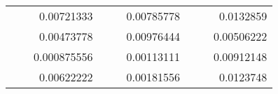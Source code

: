 \begin{table}[H]
\begin{tabular}{|ccrccrccc}
\rowcolor[HTML]{DDFDFF} 
\multicolumn{1}{|c|}{\cellcolor[HTML]{FFFFC7}}                                & \multicolumn{1}{c|}{\cellcolor[HTML]{DDFDFF}}                      & \multicolumn{1}{r|}{\cellcolor[HTML]{DAE8FC}0.00721333}  & \multicolumn{1}{c|}{\cellcolor[HTML]{FFFFC7}}                                & \multicolumn{1}{c|}{\cellcolor[HTML]{DDFDFF}}                       & \multicolumn{1}{r|}{\cellcolor[HTML]{DDFDFF}0.00785778}  & \multicolumn{1}{c|}{\cellcolor[HTML]{FFFFC7}}                                & \multicolumn{1}{c|}{\cellcolor[HTML]{DDFDFF}}                      & \multicolumn{1}{r|}{\cellcolor[HTML]{DDFDFF}0.0132859}   \\ \cline{3-3} \cline{6-6} \cline{9-9} 
\multicolumn{1}{|c|}{\cellcolor[HTML]{FFFFC7}}                                & \multicolumn{1}{c|}{\cellcolor[HTML]{DDFDFF}}                      & \multicolumn{1}{r|}{\cellcolor[HTML]{DDFDFF}0.00473778}  & \multicolumn{1}{c|}{\cellcolor[HTML]{FFFFC7}}                                & \multicolumn{1}{c|}{\cellcolor[HTML]{DDFDFF}}                       & \multicolumn{1}{r|}{\cellcolor[HTML]{DAE8FC}0.00976444}  & \multicolumn{1}{c|}{\cellcolor[HTML]{FFFFC7}}                                & \multicolumn{1}{c|}{\cellcolor[HTML]{DDFDFF}}                      & \multicolumn{1}{r|}{\cellcolor[HTML]{DAE8FC}0.00506222}  \\ \cline{3-3} \cline{6-6} \cline{9-9} 
\rowcolor[HTML]{DDFDFF} 
\multicolumn{1}{|c|}{\cellcolor[HTML]{FFFFC7}}                                & \multicolumn{1}{c|}{\cellcolor[HTML]{DDFDFF}}                      & \multicolumn{1}{r|}{\cellcolor[HTML]{DAE8FC}0.000875556} & \multicolumn{1}{c|}{\cellcolor[HTML]{FFFFC7}}                                & \multicolumn{1}{c|}{\cellcolor[HTML]{DDFDFF}}                       & \multicolumn{1}{r|}{\cellcolor[HTML]{DDFDFF}0.00113111}  & \multicolumn{1}{c|}{\cellcolor[HTML]{FFFFC7}}                                & \multicolumn{1}{c|}{\cellcolor[HTML]{DDFDFF}}                      & \multicolumn{1}{r|}{\cellcolor[HTML]{DDFDFF}0.00912148}  \\ \cline{3-3} \cline{6-6} \cline{9-9} 
\multicolumn{1}{|c|}{\cellcolor[HTML]{FFFFC7}}                                & \multicolumn{1}{c|}{\cellcolor[HTML]{DDFDFF}}                      & \multicolumn{1}{r|}{\cellcolor[HTML]{DDFDFF}0.00622222}  & \multicolumn{1}{c|}{\cellcolor[HTML]{FFFFC7}}                                & \multicolumn{1}{c|}{\cellcolor[HTML]{DDFDFF}}                       & \multicolumn{1}{r|}{\cellcolor[HTML]{DAE8FC}0.00181556}  & \multicolumn{1}{c|}{\cellcolor[HTML]{FFFFC7}}                                & \multicolumn{1}{c|}{\cellcolor[HTML]{DDFDFF}}                      & \multicolumn{1}{r|}{\cellcolor[HTML]{DAE8FC}0.0123748}   \\ \cline{3-3} \cline{6-6} \cline{9-9} 

\end{tabular}
\end{table}

